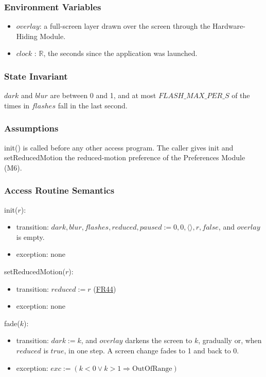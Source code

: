 \documentclass[10pt, titlepage]{article}
\newcommand{\srsurl}{https://team-hindsight.github.io/ophthamology-game/SRS/SRS.pdf}
\newcommand{\srsitemref}[2]{\href{\srsurl\#nameddest=#1}{#2}}
\newcommand{\R}{\mathbb{R}}
\newcommand{\T}[1]{\mathit{#1}}          %
\newcommand{\exc}{\mathit{exc}}
\newcommand{\true}{\mathit{true}}
\newcommand{\false}{\mathit{false}}
\begin{document}
\subsubsection{Environment Variables}

\begin{itemize}
\item $\T{overlay}$: a full-screen layer drawn over the screen through the
  Hardware-Hiding Module.
\item $\T{clock}$ : $\R$, the seconds since the application was launched.
\end{itemize}

\subsubsection{State Invariant}

$\T{dark}$ and $\T{blur}$ are between 0 and 1, and at most
$\T{FLASH\_MAX\_PER\_S}$ of the times in $\T{flashes}$ fall in the last second.

\subsubsection{Assumptions}

init() is called before any other access program. The caller gives init and
setReducedMotion the reduced-motion preference of the Preferences Module (M6).

\subsubsection{Access Routine Semantics}

\noindent init($r$):
\begin{itemize}
\item transition: $\T{dark}, \T{blur}, \T{flashes}, \T{reduced}, \T{paused}
  := 0, 0, \langle\rangle, r, \false$, and $\T{overlay}$ is empty.
\item exception: none
\end{itemize}

\noindent setReducedMotion($r$):
\begin{itemize}
\item transition: $\T{reduced} := r$ (\srsitemref{FR_Preferences}{FR44})
\item exception: none
\end{itemize}

\noindent fade($k$):
\begin{itemize}
\item transition: $\T{dark} := k$, and $\T{overlay}$ darkens the screen to
  $k$, gradually or, when $\T{reduced}$ is $\true$, in one step. A screen
  change fades to 1 and back to 0.
\item exception: $\exc := (k < 0 \vee k > 1 \Rightarrow \text{OutOfRange})$
\end{itemize}
\end{document}
